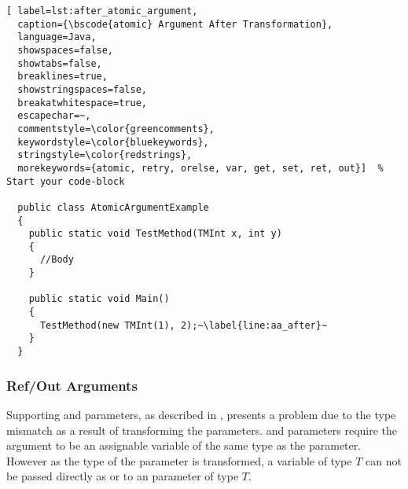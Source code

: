 \begin{lstlisting}[ label=lst:after_atomic_argument,
  caption={\bscode{atomic} Argument After Transformation},
  language=Java,  
  showspaces=false,
  showtabs=false,
  breaklines=true,
  showstringspaces=false,
  breakatwhitespace=true,
  escapechar=~,
  commentstyle=\color{greencomments},
  keywordstyle=\color{bluekeywords},
  stringstyle=\color{redstrings},
  morekeywords={atomic, retry, orelse, var, get, set, ret, out}]  % Start your code-block

  public class AtomicArgumentExample
  {
    public static void TestMethod(TMInt x, int y)
    {
      //Body
    }

    public static void Main()
    {
      TestMethod(new TMInt(1), 2);~\label{line:aa_after}~
    }
  }
\end{lstlisting}

\subsubsection{Ref/Out Arguments}
Supporting   and  parameters, as described in , presents a problem due to the type mismatch as a result of transforming the parameters.  and  parameters require the argument to be an assignable variable of the same type as the parameter. However as the type of the parameter is transformed, a variable of type $T$ can not be passed directly as  or  to an  parameter of type $T$.


